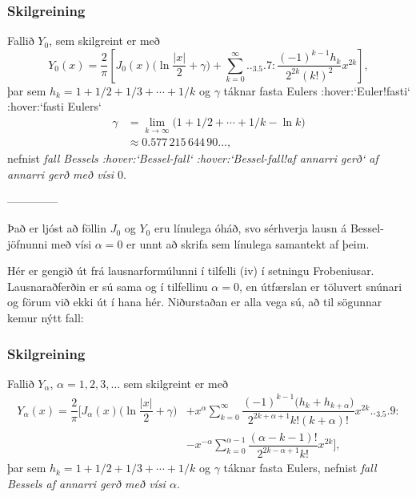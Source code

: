 \subsubsection{Skilgreining}  Fallið $Y_0$, sem skilgreint er með 
\begin{equation*}
Y_0(x)=\dfrac 2{\pi}\left[J_0(x)\bigg(\ln \dfrac {|x|}2+{\gamma}\bigg)
+\sum\limits_{k=0}^{\infty}

.. _3.5.7:

\dfrac{(-1)^{k-1}h_k}{2^{2k}(k!)^2} x^{2k}\right],
\end{equation*}
þar sem $h_k=1+1/2+1/3+\cdots+1/k$ og ${\gamma}$ táknar fasta
Eulers :hover:`Euler!fasti` :hover:`fasti Eulers`
\begin{align*}
{\gamma}&=\lim\limits_{k\to {\infty}} \big(1+1/2+\cdots+1/k-\ln k\big)
\\
&\approx 0.577 \,  215 \,  644 \, 90 \dots,\nonumber
\end{align*}
nefnist {\it fall Bessels :hover:`Bessel-fall` :hover:`Bessel-fall!af
annarri gerð` af annarri gerð með vísi $0$}.


--------------



Það er ljóst að föllin $J_0$ og $Y_0$ eru línulega óháð, svo sérhverja
lausn á Bessel-jöfnunni með vísi ${\alpha}=0$ er unnt að skrifa sem
línulega samantekt af þeim. 


Hér er gengið út frá lausnarformúlunni í tilfelli (iv) í setningu
Frobeniusar.  Lausnaraðferðin er sú sama og í tilfellinu ${\alpha}=0$,
en útfærslan er töluvert snúnari og förum við ekki út í hana hér. 
Niðurstaðan er alla vega sú, að  til sögunnar kemur nýtt fall:


\subsubsection{Skilgreining}  Fallið $Y_{\alpha}$, ${\alpha}=1,2,3,\dots$ sem skilgreint er með 
\begin{align*}
Y_{\alpha}(x)=\dfrac 2{\pi}\bigg[
J_{\alpha}(x)\bigg(\ln \dfrac {|x|}2+{\gamma}\bigg)
&+x^{\alpha}\sum\limits_{k=0}^{\infty}
\dfrac{(-1)^{k-1}\big(h_k+h_{k+\alpha}\big)}
{2^{2k+\alpha+1}k!(k+{\alpha})!} x^{2k}

.. _3.5.9:
\\
&-x^{-\alpha}\sum\limits_{k=0}^{\alpha-1}
\dfrac{(\alpha-k-1)!}{2^{2k-\alpha+1}k!}x^{2k}\bigg],\nonumber
\end{align*}
þar sem $h_k=1+1/2+1/3+\cdots+1/k$  og ${\gamma}$ táknar fasta
Eulers,
nefnist {\it fall Bessels af annarri gerð með vísi ${\alpha}$}.


